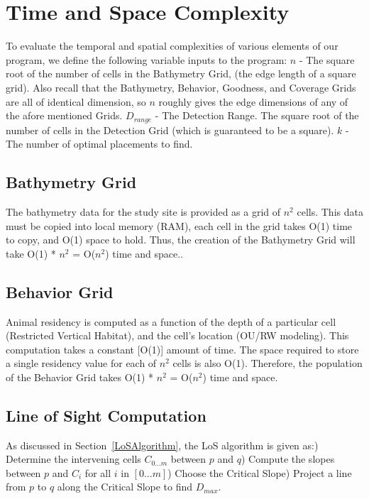\section{Time and Space Complexity}
\label{computationalComplexity}
To evaluate the temporal and spatial complexities of various elements of our program, we define the following variable inputs to the program:\newline
$n$ - The square root of the number of cells in the Bathymetry Grid, (the edge length of a square grid).  Also recall that the Bathymetry, Behavior, Goodness, and Coverage Grids are all of identical dimension, so $n$ roughly gives the edge dimensions of any of the afore mentioned Grids.\newline
$D_{range}$ - The Detection Range.  The square root of the number of cells in the Detection Grid (which is guaranteed to be a square).\newline
$k$ - The number of optimal placements to find.\newline

\subsection{Bathymetry Grid}
The bathymetry data for the study site is provided as a grid of $n^2$ cells.  This data must be copied into local memory (RAM), each cell in the grid takes O(1) time to copy, and O(1) space to hold.  Thus, the creation of the Bathymetry Grid will take O(1) * $n^2$ = O($n^2$) time and space..

\subsection{Behavior Grid}
Animal residency is computed as a function of the depth of a particular cell (Restricted Vertical Habitat), and the cell's location (OU/RW modeling).  This computation takes a constant [O(1)] amount of time.  The space required to store a single residency value for each of $n^2$ cells is also O(1).  Therefore, the population of the Behavior Grid takes O(1) * $n^2$ = O($n^2$) time and space.


\subsection{Line of Sight Computation}
\label{bigOLoS}
As discussed in Section~\ref{LoSAlgorithm}, the LoS algorithm is given as:) Determine the intervening cells $C_{0...m}$ between $p$ and $q$) Compute the slopes between $p$ and $C_i$ for all $i$ in $[0 ... m]$) Choose the Critical Slope) Project a line from $p$ to $q$ along the Critical Slope to find $D_{max}$.\newline

